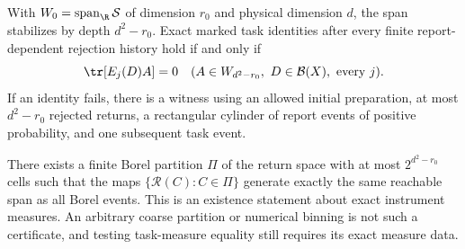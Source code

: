 \begin{theorem}\label{thm:borel-return}
With $W_0=\operatorname{span}_{\R}\mathcal S$ of dimension $r_0$ and physical dimension $d$, the span stabilizes by depth $d^2-r_0$. Exact marked task identities after every finite report-dependent rejection history hold if and only if
\begin{equation}\label{eq:borel-return}
 \tr[E_j(D)A]=0\quad
 (A\in W_{d^2-r_0},\ D\in\mathcal B(X),\ \text{every }j).
\end{equation}
If an identity fails, there is a witness using an allowed initial preparation, at most $d^2-r_0$ rejected returns, a rectangular cylinder of report events of positive probability, and one subsequent task event.

There exists a finite Borel partition $\Pi$ of the return space with at most $2^{d^2-r_0}$ cells such that the maps $\{\mathcal R(C):C\in\Pi\}$ generate exactly the same reachable span as all Borel events. This is an existence statement about exact instrument measures. An arbitrary coarse partition or numerical binning is not such a certificate, and testing task-measure equality still requires its exact measure data.
\end{theorem}

